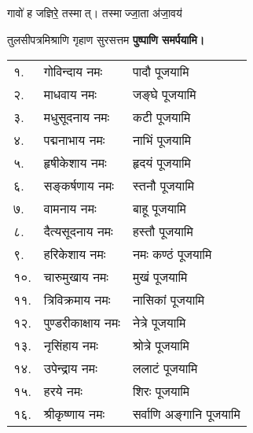 \begin{center}
{गावो॑ ह जज्ञिरे॒ तस्मात्। तस्माज्जा॒ता अ॑जा॒वय॑}

{तुलसीपत्रमिश्राणि गृहाण सुरसत्तम}
\textbf{\devAya{} पुष्पाणि समर्पयामि।}


\begin{longtable}{ll@{—}l}
१. & गोविन्दाय नमः & पादौ पूजयामि \\
२. & माधवाय नमः &  जङ्घे पूजयामि \\
३. & मधुसूदनाय नमः & कटी पूजयामि \\
४. & पद्मनाभाय नमः & नाभिं पूजयामि \\
५. & हृषीकेशाय नमः & हृदयं पूजयामि \\
६. & सङ्कर्षणाय नमः & स्तनौ पूजयामि \\
७. & वामनाय नमः & बाहू पूजयामि \\
८. & दैत्यसूदनाय नमः & हस्तौ पूजयामि \\
९. & हरिकेशाय नमः & नमः कण्ठं पूजयामि \\
१०. & चारुमुखाय नमः & मुखं पूजयामि \\
११. & त्रिविक्रमाय नमः & नासिकां पूजयामि \\
१२. & पुण्डरीकाक्षाय नमः & नेत्रे पूजयामि \\
१३. & नृसिंहाय नमः & श्रोत्रे पूजयामि \\
१४. & उपेन्द्राय नमः & ललाटं पूजयामि \\
१५. & हरये नमः & शिरः पूजयामि \\
१६. & श्रीकृष्णाय नमः & सर्वाणि अङ्गानि पूजयामि \\
\end{longtable}


\end{center}
